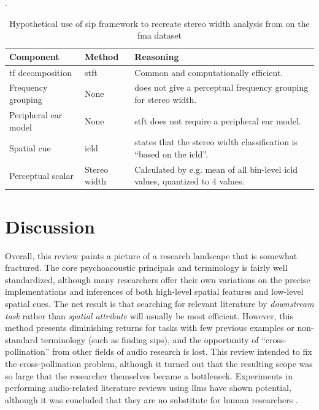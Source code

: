 \documentclass[referee,pdflatex,sn-mathphys-num]{sn-jnl}%
\newcommand{\q}[1]{\enquote{#1}}
\begin{document}
\begin{table}[thb]
  \renewcommand{\arraystretch}{1.3} %
  \centering
  \caption{Hypothetical use of \gls{sip} framework to recreate stereo width analysis from \cite{mourgelaExploringTrendsAudio2024} on the \gls{fma} dataset}.
  \label{tab:hypothetical_sip}
  \begin{tabularx}{\linewidth}{llX}
    \toprule
    Component & Method & Reasoning \\
    \midrule
    \gls{tf} decomposition & \gls{stft} & Common and computationally efficient.\\
    Frequency grouping & None & \cite{mourgelaExploringTrendsAudio2024} does not give a perceptual frequency grouping for stereo width. \\
    Peripheral ear model & None & \gls{stft} does not require a peripheral ear model. \\
    Spatial cue & \gls{icld} & \cite{mourgelaExploringTrendsAudio2024} states that the stereo width classification is \enquote{based on the \gls{icld}}.\\
    Perceptual scalar & Stereo width & Calculated by e.g. mean of all bin-level \gls{icld} values, quantized to 4 values. \\
    \bottomrule
\end{tabularx}
\end{table}

\section{Discussion}
\label{sec:discussion}

Overall, this review paints a picture of a research landscape that is somewhat fractured. The core psychoacoustic principals and terminology is fairly well standardized, although many researchers offer their own variations on the precise implementations and inferences of both high-level spatial features and low-level spatial cues. The net result is that searching for relevant literature by \textit{downstream task} rather than \textit{spatial attribute} will usually be most efficient. However, this method presents diminishing returns for tasks with few previous examples or non-standard terminology (such as finding \glspl{sip}), and the opportunity of \q{cross-pollination} from other fields of audio research is lost. This review intended to fix the cross-pollination problem, although it turned out that the resulting scope was so large that the researcher themselves became a bottleneck. Experiments in performing audio-related literature reviews using \glspl{llm} have shown potential, although it was concluded that they are no substitute for human researchers \cite{santosExploringPotentialDataDriven2024}.
\end{document}
